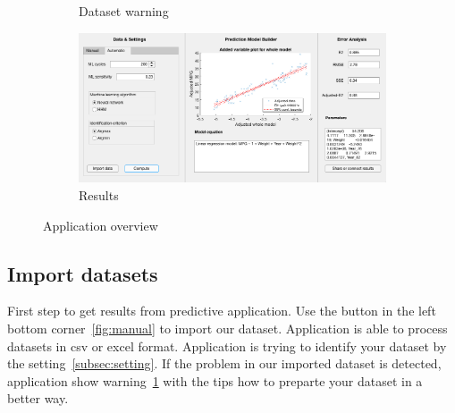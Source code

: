\begin{figure}
\begin{subfigure}[b]{0.4\textwidth}
            \caption{Dataset warning}
            \label{fig:warning}
        \end{subfigure}
        \hspace{0.1\textwidth}
        \begin{subfigure}[b]{0.4\textwidth}
            \includegraphics[width=\textwidth]{figures/result.png}
            \caption{Results}
            \label{fig:results}
        \end{subfigure}
        \label{fig:appoverview}
        \caption{Application overview}
    \end{figure}
        \subsection{Import datasets}
        First step to get results from predictive application. Use the button in the left
        bottom corner~\ref{fig:manual} to import our dataset. Application is able to
        process datasets in csv or excel format. Application is trying to identify
        your dataset by the setting~\ref{subsec:setting}. If the problem in our imported
        dataset is detected, application show warning~\ref{fig:warning} with the tips
        how to preparte your dataset in a better way.
